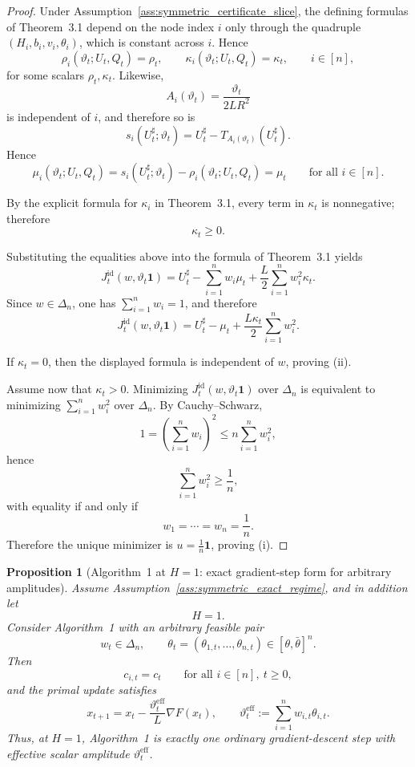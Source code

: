 \documentclass{article}
\newtheorem{proposition}[theorem]{Proposition}
\theoremstyle{definition}
\newcommand{\one}{\mathbf 1}
\begin{document}
\begin{proof}
Under Assumption~\ref{ass:symmetric_certificate_slice}, the defining formulas of Theorem~3.1 depend on the node index $i$ only through the quadruple $(H_i,b_i,v_i,\theta_i)$, which is constant across $i$. Hence
\[
\rho_i(\vartheta_t;U_t,Q_t) = \rho_t,
\qquad
\kappa_i(\vartheta_t;U_t,Q_t) = \kappa_t,
\qquad i \in [n],
\]
for some scalars $\rho_t,\kappa_t$. Likewise,
\[
A_i(\vartheta_t) = \frac{\vartheta_t}{2LR^2}
\]
is independent of $i$, and therefore so is
\[
s_i(U_t^\sharp;\vartheta_t)
=
U_t^\sharp - T_{A_i(\vartheta_t)}(U_t^\sharp).
\]
Hence
\[
\mu_i(\vartheta_t;U_t,Q_t)
=
s_i(U_t^\sharp;\vartheta_t) - \rho_i(\vartheta_t;U_t,Q_t)
=
\mu_t
\qquad \text{for all } i \in [n].
\]

By the explicit formula for $\kappa_i$ in Theorem~3.1, every term in $\kappa_t$ is nonnegative; therefore
\[
\kappa_t \ge 0.
\]

Substituting the equalities above into the formula of Theorem~3.1 yields
\[
J_t^{\mathrm{id}}(w,\vartheta_t\one)
=
U_t^\sharp
-
\sum_{i=1}^n w_i \mu_t
+
\frac{L}{2}\sum_{i=1}^n w_i^2 \kappa_t.
\]
Since $w \in \Delta_n$, one has $\sum_{i=1}^n w_i=1$, and therefore
\[
J_t^{\mathrm{id}}(w,\vartheta_t\one)
=
U_t^\sharp - \mu_t + \frac{L\kappa_t}{2}\sum_{i=1}^n w_i^2.
\]

If $\kappa_t=0$, then the displayed formula is independent of $w$, proving (ii).

Assume now that $\kappa_t>0$. Minimizing $J_t^{\mathrm{id}}(w,\vartheta_t\one)$ over $\Delta_n$ is equivalent to minimizing $\sum_{i=1}^n w_i^2$ over $\Delta_n$. By Cauchy--Schwarz,
\[
1
=
\left(\sum_{i=1}^n w_i\right)^2
\le
n\sum_{i=1}^n w_i^2,
\]
hence
\[
\sum_{i=1}^n w_i^2 \ge \frac1n,
\]
with equality if and only if
\[
w_1 = \cdots = w_n = \frac1n.
\]
Therefore the unique minimizer is $u=\frac1n\one$, proving (i).
\end{proof}

\begin{proposition}[Algorithm~1 at $H=1$: exact gradient-step form for arbitrary amplitudes]
\label{prop:alg1_H1_general}
Assume Assumption~\ref{ass:symmetric_exact_regime}, and in addition let
\[
H=1.
\]
Consider Algorithm~1 with an arbitrary feasible pair
\[
w_t \in \Delta_n,
\qquad
\theta_t = (\theta_{1,t},\dots,\theta_{n,t}) \in [\theta,\bar\theta]^n.
\]
Then
\[
c_{i,t} = c_t
\qquad \text{for all } i \in [n], \ t \ge 0,
\]
and the primal update satisfies
\[
x_{t+1}
=
x_t - \frac{\vartheta_t^{\mathrm{eff}}}{L}\nabla F(x_t),
\qquad
\vartheta_t^{\mathrm{eff}} := \sum_{i=1}^n w_{i,t}\theta_{i,t}.
\]
Thus, at $H=1$, Algorithm~1 is exactly one ordinary gradient-descent step with effective scalar amplitude $\vartheta_t^{\mathrm{eff}}$.
\end{proposition}
\end{document}

